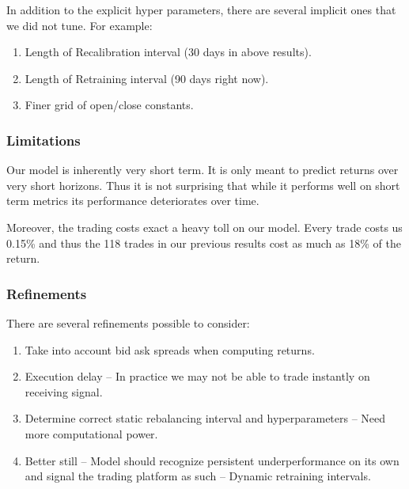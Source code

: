 \documentclass{article}
\begin{document}
In addition to the explicit hyper parameters, there are several implicit ones that we did not tune. For example: 

\begin{enumerate}
  \item Length of Recalibration interval (30 days in above results).
  \item Length of Retraining interval (90 days right now).
  \item Finer grid of open/close constants.
\end{enumerate}

\subsubsection{Limitations}

Our model is inherently very short term. It is only meant to predict returns over very short horizons. Thus it is not surprising that while it performs well on short term metrics its performance deteriorates over time. 

Moreover, the trading costs exact a heavy toll on our model. Every trade costs us 0.15\% and thus the 118 trades in our previous results cost as much as 18\% of the return.

\subsubsection{Refinements}

There are several refinements possible to consider:

\begin{enumerate}
  \item Take into account bid ask spreads when computing returns.
  \item Execution delay – In practice we may not be able to trade instantly on receiving signal.
  \item Determine correct static rebalancing interval and hyperparameters – Need more computational power.
  \item Better still – Model should recognize persistent underperformance on its own and signal the trading platform as such – Dynamic retraining intervals.
\end{enumerate}
\end{document}
